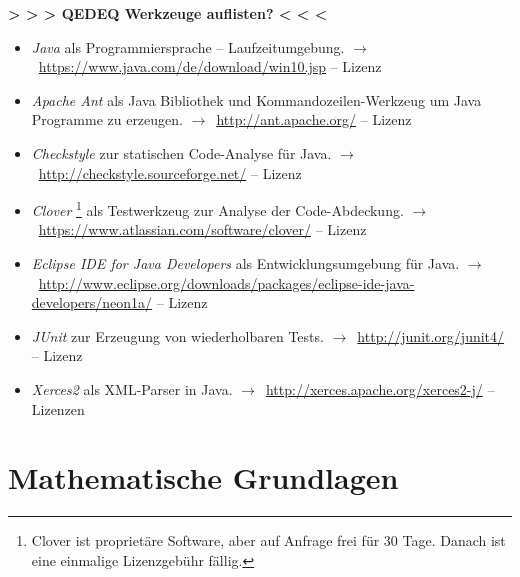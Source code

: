 \documentclass[english,ngerman,parskip=half,headsepline,footsepline]{scrreprt}
\newcommand*{\texthead}[1]{\textnormal{\textsf{\textbf{#1}}}}%
\newcommand{\Chead}[1]{\chead{\texthead{#1}}}
\newcommand{\Ihead}[1]{\ihead{\texthead{#1}}}
\newcommand{\Thispagestyle}{\thispagestyle{scrheadings}}
\newcommand*{\Chaptername}{\chaptername}%
\newcommand*{\nextchapter}{%
	\Thispagestyle%
	\clearpage%
}
\newcommand*{\newchapter}[1]{%
	\markboth{#1}{}
	\Chead{\leftmark}%
	\Ihead{\Chaptername~\thechapter}%
	\Thispagestyle%
}
\newcounter{Enumi}%
\begin{document}
	\textbf{> > > QEDEQ Werkzeuge auflisten? < < <}%

	\begin{itemize}
		\setcounter{enumi}{\value{Enumi}}

		\item\label{Werkzeug:Java}\emph{Java} als Programmiersprache -- Laufzeitumgebung.
		$\rightarrow$~\url{https://www.java.com/de/download/win10.jsp} -- Lizenz \seename~\cite{bib:JavaSE}

		\item\label{Werkzeug:Apache Ant}\emph{Apache Ant} als Java Bibliothek und Kommandozeilen-Werkzeug um Java Programme zu erzeugen.
		$\rightarrow$~\url{http://ant.apache.org/} -- Lizenz \seename~\cite{bib:Apacheii}

		\item\label{Werkzeug:Checkstyle}\emph{Checkstyle} zur statischen Code-Analyse für Java.
		$\rightarrow$~\url{http://checkstyle.sourceforge.net/} -- Lizenz \seename~\cite{bib:LGPLii}

		\item\label{Werkzeug:Clover}\emph{Clover}%
		\footnote{%
			Clover ist proprietäre Software, aber auf Anfrage frei für 30 Tage.
			Danach ist eine einmalige Lizenzgebühr fällig.
		}
		als Testwerkzeug zur Analyse der Code-Abdeckung.
		$\rightarrow$~\url{https://www.atlassian.com/software/clover/} -- Lizenz \seename~\cite{bib:Clover}

		\item\label{Werkzeug:Eclipse Java}\emph{Eclipse IDE for Java Developers} als Entwicklungsumgebung für Java.
		$\rightarrow$~\url{http://www.eclipse.org/downloads/packages/eclipse-ide-java-developers/neon1a/} -- Lizenz \seename~\cite{bib:OSI}

		\item\label{Werkzeug:JUnit}\emph{JUnit} zur Erzeugung von wiederholbaren Tests.
		$\rightarrow$~\url{http://junit.org/junit4/} -- Lizenz \seename~\cite{bib:EPL}

		\item\label{Werkzeug:Xerces2}\emph{Xerces2} als XML-Parser in Java.
		$\rightarrow$~\url{http://xerces.apache.org/xerces2-j/} -- Lizenzen \seename~\cite{bib:Apacheii, bib:SAX, bib:WDCDL, bib:WDCSNL}

		\setcounter{Enumi}{\value{enumi}}
	\end{itemize}

	\nextchapter
	\chapter{Mathematische Grundlagen}%
	\newchapter{Mathematische Grundlagen}
	\label{cha:Grundlagen}
\end{document}
